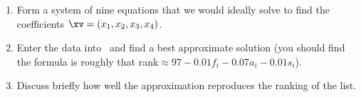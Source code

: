 \begin{exercise}
\begin{enumerate}
\item Form a system of nine equations that we would ideally solve to find the coefficients \(\xv=(x_1,x_2,x_3,x_4)\).
\setbox\ajrqrbox\hbox{}%
\marginajrbox%
\item Enter the data into \script\ and find a best approximate solution (you should find the formula is roughly that rank\({}\approx 97-0.01f_i-0.07a_i-0.01s_i\)).
\item Discuss briefly how well the approximation reproduces the ranking of the list.
\end{enumerate}
\end{exercise}





\begin{comment}
Might be nice to show \(1/f\) structure of music, Voss \& Clark.  However, probably too data hungry, and too hard to explain the Fourier transform to the power spectrum.  
Could it be done after orthogonal diagonalization?

Exercises involving higher-D inference.
\end{comment}





